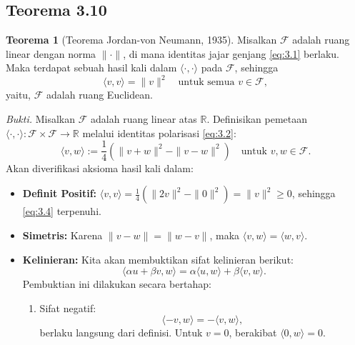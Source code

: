 \documentclass[aspectratio=169,11pt]{beamer}
\theoremstyle{definition}
\newtheorem{teorema}{Teorema}
\newcommand{\R}{\mathbb{R}}
\begin{document}
\subsection{Teorema 3.10}

\begin{frame}[allowframebreaks]{\insertsection}{\insertsubsection}
  \begin{teorema}[Teorema Jordan-von Neumann, 1935]
    Misalkan $\mathcal{F}$ adalah ruang linear dengan norma $\| \cdot \|$, di mana identitas jajar genjang \eqref{eq:3.1} berlaku. Maka terdapat sebuah hasil kali dalam $\langle \cdot, \cdot \rangle$ pada $\mathcal{F}$, sehingga
    \begin{equation}
      \langle v,v \rangle = \|v\|^2 \quad \text{untuk semua } v \in \mathcal{F}, \label{eq:3.4}
    \end{equation}
    yaitu, $\mathcal{F}$ adalah ruang Euclidean.
  \end{teorema}

  \textit{Bukti.}
  Misalkan $\mathcal{F}$ adalah ruang linear atas $\R$. Definisikan pemetaan $\langle \cdot, \cdot \rangle : \mathcal{F} \times \mathcal{F} \to \R$ melalui identitas polarisasi \eqref{eq:3.2}:
  \begin{equation*}
    \langle v,w \rangle := \frac{1}{4}(\|v+w\|^2 - \|v-w\|^2) \quad \text{untuk } v,w \in \mathcal{F}.
  \end{equation*}
  Akan diverifikasi aksioma hasil kali dalam:
  \begin{itemize}
    \item \textbf{Definit Positif:}
          $\langle v,v \rangle = \frac{1}{4}(\|2v\|^2 - \|0\|^2) = \|v\|^2 \ge 0$, sehingga \eqref{eq:3.4} terpenuhi.

    \item \textbf{Simetris:}
          Karena $\|v-w\| = \|w-v\|$, maka $\langle v,w \rangle = \langle w,v \rangle$.

    \item \textbf{Kelinieran:}
          Kita akan membuktikan sifat kelinieran berikut:
          \begin{equation}
            \langle \alpha u + \beta v, w \rangle = \alpha \langle u,w \rangle + \beta \langle v,w \rangle. \label{eq:3.5}
          \end{equation}
          Pembuktian ini dilakukan secara bertahap:
          \begin{enumerate}
            \item Sifat negatif:
                  \begin{equation}
                    \langle -v, w \rangle = -\langle v, w \rangle, \label{eq:3.6}
                  \end{equation}
                  berlaku langsung dari definisi. Untuk $v=0$, berakibat $\langle 0,w \rangle = 0$.


\end{enumerate}
\end{itemize}
\end{frame}
\end{document}
